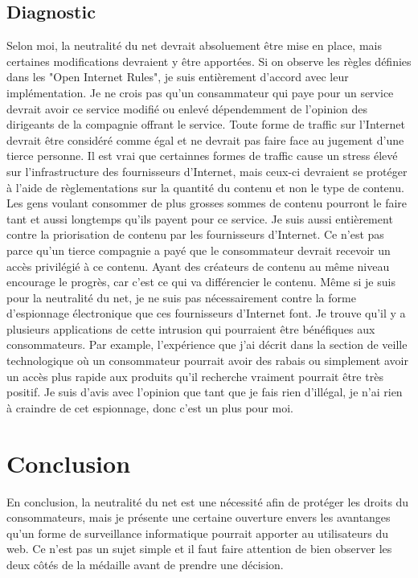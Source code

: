 \documentclass[12pt]{article}
\begin{document}
\subsection{Diagnostic}
Selon moi, la neutralité du net devrait absoluement être mise en place, mais certaines modifications devraient y être apportées. Si on observe les règles définies dans les "Open Internet Rules", je suis entièrement d'accord avec leur implémentation. Je ne crois pas qu'un consammateur qui paye pour un service devrait avoir ce service modifié ou enlevé dépendemment de l'opinion des dirigeants de la compagnie offrant le service. Toute forme de traffic sur l'Internet devrait être considéré comme égal et ne devrait pas faire face au jugement d'une tierce personne. Il est vrai que certainnes formes de traffic cause un stress élevé sur l'infrastructure des fournisseurs d'Internet, mais ceux-ci devraient se protéger à l'aide de règlementations sur la quantité du contenu et non le type de contenu. Les gens voulant consommer de plus grosses sommes de contenu pourront le faire tant et aussi longtemps qu'ils payent pour ce service. Je suis aussi entièrement contre la priorisation de contenu par les fournisseurs d'Internet. Ce n'est pas parce qu'un tierce compagnie a payé que le consommateur devrait recevoir un accès privilégié à ce contenu. Ayant des créateurs de contenu au même niveau encourage le progrès, car c'est ce qui va différencier le contenu. Même si je suis pour la neutralité du net, je ne suis pas nécessairement contre la forme d'espionnage électronique que ces fournisseurs d'Internet font. Je trouve qu'il y a plusieurs applications de cette intrusion qui pourraient être bénéfiques aux consommateurs. Par example, l'expérience que j'ai décrit dans la section de veille technologique où un consommateur pourrait avoir des rabais ou simplement avoir un accès plus rapide aux produits qu'il recherche vraiment pourrait être très positif. Je suis d'avis avec l'opinion que tant que je fais rien d'illégal, je n'ai rien à craindre de cet espionnage, donc c'est un plus pour moi.


\section{Conclusion}
En conclusion, la neutralité du net est une nécessité afin de protéger les droits du consommateurs, mais je présente une certaine ouverture envers les avantanges qu'un forme de surveillance informatique pourrait apporter au utilisateurs du web. Ce n'est pas un sujet simple et il faut faire attention de bien observer les deux côtés de la médaille avant de prendre une décision.
\end{document}
